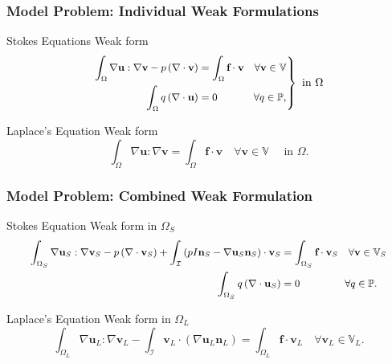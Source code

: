 \documentclass{beamer}
\theoremstyle{definition}
\begin{document}
\begin{frame}
\frametitle{Model Problem: Individual Weak Formulations}
\begin{block}{Stokes Equations Weak form}\vspace{-0mm}
	\begin{equation*}\label{weak_stokes_1_ind}
	\begin{rcases}
	\small{\begin{aligned}
		\int_{\Omega}\nabla \textbf{u} : \nabla \textbf{v}-p\left(\nabla \cdot \textbf{v}\right)  &=\int_{\Omega}\textbf{f}\cdot \textbf{v}  \quad \forall  \textbf{v}\in \mathbb{V}\\
		\int_{\Omega}q\left(\nabla \cdot \textbf{u}\right) &= 0\quad\quad\quad\,\,\, \forall q\in \mathbb{P},
		\end{aligned}}
	\end{rcases}\text{ in }\Omega
	\end{equation*}
\end{block}
\begin{block}{Laplace's Equation Weak form}
	\begin{equation*}\label{weak_poisson_ind}
	\int_{\Omega}\nabla \textbf{u} : \nabla \textbf{v} = 
	\int_{\Omega}\textbf{f}\cdot \textbf{v}  \quad \forall  \textbf{v}\in \mathbb{V}\quad\text{ in } \Omega.
	\end{equation*}
\end{block}
\end{frame}


  \begin{frame}
  \frametitle{Model Problem: Combined Weak Formulation}
  \begin{block}{Stokes Equation Weak form in $\Omega_S$}\vspace{-4mm}
  \begin{equation*}\label{weak_stokes_1}
  \small{\begin{aligned}
  	\int_{\Omega_S}\nabla \textbf{u}_S : \nabla \textbf{v}_S-p\left(\nabla \cdot \textbf{v}_S\right) +\int_{\mathcal{I}} \left(pI \textbf{n}_S-\nabla\textbf{u}_S\textbf{n}_S\right)\cdot \textbf{v}_S &=\int_{\Omega_S}\textbf{f}\cdot \textbf{v}_S  \quad \forall  \textbf{v}\in \mathbb{V}_S\\
  	\int_{\Omega_S}q\left(\nabla \cdot \textbf{u}_S\right) &= 0\quad\quad\quad\,\,\quad \forall q\in \mathbb{P}.
  	\end{aligned}}
  \end{equation*}
  \end{block}
\begin{block}{Laplace's Equation Weak form in $\Omega_L$}
\begin{equation*}\label{weak_poisson}
\int_{\Omega_L}\nabla \textbf{u}_L : \nabla \textbf{v}_L - \int_{\mathcal{I}} \textbf{v}_L \cdot \left(\nabla\textbf{u}_L\textbf{n}_L\right)= 
\int_{\Omega_L}\textbf{f}\cdot \textbf{v}_L  \quad \forall  \textbf{v}_L\in \mathbb{V}_L.
\end{equation*}
\end{block}

  \end{frame}
\end{document}
